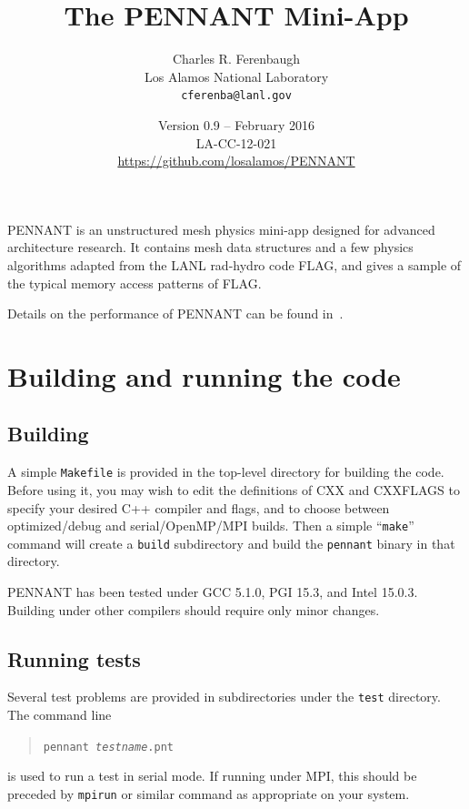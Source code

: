 \documentclass[11pt,letterpaper]{article}
\begin{document}
\title{The PENNANT Mini-App}
\author{Charles R. Ferenbaugh \\
        Los Alamos National Laboratory \\
        {\tt cferenba@lanl.gov}}
\date{Version 0.9 -- February 2016 \\
      LA-CC-12-021 \\
      \url{https://github.com/losalamos/PENNANT}}
\maketitle

PENNANT is an unstructured mesh physics mini-app designed for advanced
architecture research.
It contains mesh data structures and a few physics algorithms adapted
from the LANL rad-hydro code FLAG, and gives a
sample of the typical memory access patterns of FLAG.

Details on the performance of PENNANT can be found in~\cite{pnt1,pnt2}.


\section{Building and running the code}

\subsection{Building}

A simple {\tt Makefile} is provided in the top-level directory for building
the code.  Before using it, you may wish to edit the definitions of CXX
and CXXFLAGS to specify your desired C++ compiler and flags, and to
choose between optimized/debug and serial/OpenMP/MPI builds.  Then
a simple ``{\tt make}'' command will create a {\tt build} subdirectory and
build the {\tt pennant} binary in that directory.

PENNANT has been tested under GCC 5.1.0, PGI 15.3, and Intel 15.0.3.
Building under other compilers should require only minor changes.

\subsection{Running tests}

Several test problems are provided in subdirectories under the {\tt test}
directory.  The command line
\begin{quote}
{\tt pennant \emph{testname}.pnt}
\end{quote}
is used to run a test in serial mode.  If running under MPI, this should
be preceded by {\tt mpirun} or similar command as appropriate on your
system.
\end{document}
